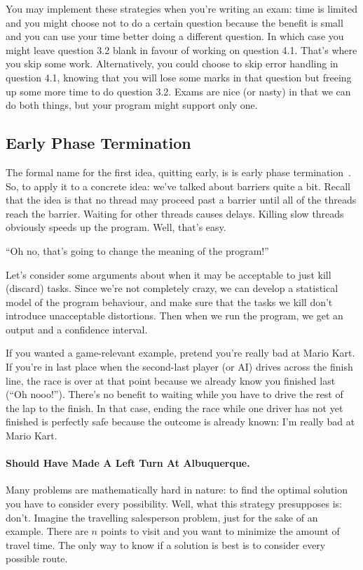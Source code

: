 \documentclass[a4paper]{report}
\begin{document}
You may implement these strategies when you're writing an exam: time is limited and you might choose not to do a certain question because the benefit is small and you can use your time better doing a different question. In which case you might leave question 3.2 blank in favour of working on question 4.1. That's where you skip some work. Alternatively, you could choose to skip error handling in question 4.1, knowing that you will lose some marks in that question but freeing up some more time to do question 3.2. Exams are nice (or nasty) in that we can do both things, but your program might support only one.

\subsection*{Early Phase Termination}

The formal name for the first idea, quitting early, is is early phase
termination~\cite{Rinard:2007:EarlyPhaseTermination}. So, to apply it to a concrete idea: we've talked about barriers quite a bit. Recall that the idea is that
no thread may proceed past a barrier until all of the threads
reach the barrier. Waiting for other threads causes delays. 
Killing slow threads obviously speeds up the program. Well, that's easy.

\begin{center}
``Oh no, that's going to change the meaning of the program!''
\end{center}

Let's consider some arguments about when it may be acceptable to just
kill (discard) tasks. Since we're not completely crazy, we can develop
a statistical model of the program behaviour, and make sure that the
tasks we kill don't introduce unacceptable distortions. Then when we
run the program, we get an output and a confidence interval.

If you wanted a game-relevant example, pretend you're really bad at Mario Kart. If you're in last place when the second-last player (or AI) drives across the finish line, the race is over at that point because we already know you finished last (``Oh nooo!''). There's no benefit to waiting while you have to drive the rest of the lap to the finish. In that case, ending the race while one driver has not yet finished is perfectly safe because the outcome is already known: I'm really bad at Mario Kart.

\paragraph{Should Have Made A Left Turn At Albuquerque.} 
Many problems are mathematically hard in nature: to find the optimal solution you have to consider every possibility. Well, what this strategy presupposes is: don't. Imagine the travelling salesperson problem, just for the sake of an example. There are $n$ points to visit and you want to minimize the amount of travel time. The only way to know if a solution is best is to consider every possible route.
\end{document}
